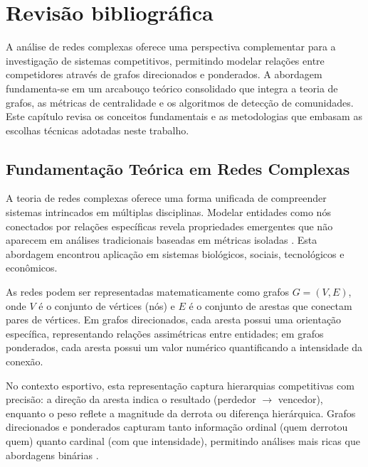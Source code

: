 \chapter{Revisão bibliográfica}
\label{cap:revisao}

A análise de redes complexas oferece uma perspectiva complementar para a investigação de sistemas competitivos, permitindo modelar relações entre competidores através de grafos direcionados e ponderados. A abordagem fundamenta-se em um arcabouço teórico consolidado que integra a teoria de grafos, as métricas de centralidade e os algoritmos de detecção de comunidades. Este capítulo revisa os conceitos fundamentais e as metodologias que embasam as escolhas técnicas adotadas neste trabalho.

\section{Fundamentação Teórica em Redes Complexas}

A teoria de redes complexas oferece uma forma unificada de compreender sistemas intrincados em múltiplas disciplinas. Modelar entidades como nós conectados por relações específicas revela propriedades emergentes que não aparecem em análises tradicionais baseadas em métricas isoladas \cite{Ahmed2023ComplexNetworks}. Esta abordagem encontrou aplicação em sistemas biológicos, sociais, tecnológicos e econômicos.

As redes podem ser representadas matematicamente como grafos $G = (V, E)$, onde $V$ é o conjunto de vértices (nós) e $E$ é o conjunto de arestas que conectam pares de vértices. Em grafos direcionados, cada aresta possui uma orientação específica, representando relações assimétricas entre entidades; em grafos ponderados, cada aresta possui um valor numérico quantificando a intensidade da conexão.

No contexto esportivo, esta representação captura hierarquias competitivas com precisão: a direção da aresta indica o resultado (perdedor $\to$ vencedor), enquanto o peso reflete a magnitude da derrota ou diferença hierárquica. Grafos direcionados e ponderados capturam tanto informação ordinal (quem derrotou quem) quanto cardinal (com que intensidade), permitindo análises mais ricas que abordagens binárias \cite{Leicht2008CommunityStructure}.

